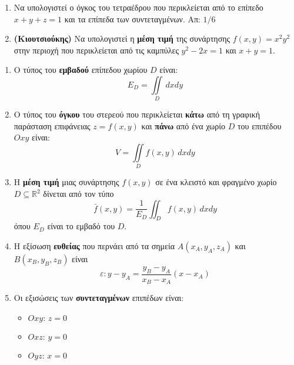 \documentclass[a4paper,table]{report}
\begin{document}
\begin{enumerate}

  \item Να υπολογιστεί ο όγκος του τετραέδρου που περικλείεται από το 
    επίπεδο $x+y+z=1$ και τα επίπεδα των συντεταγμένων.  
    \hfill Απ: ${1}/{6}$ %

  \item 
    \textbf{(Κιουτσιούκης)} Να υπολογιστεί η \textbf{μέση τιμή} της συνάρτησης 
    $ f(x,y) = x^{2}y^{2} $ στην περιοχή που περικλείεται από τις καμπύλες 
    $ y^{2}-2x=1 $ και $ x+y=1 $. 
\end{enumerate}

\vspace{\baselineskip}

\begin{center}
  \minibox{\large\bf \textcolor{Col1}{Υποδείξεις}}
\end{center}

\vspace{\baselineskip}

\begin{enumerate}
  \item Ο τύπος του \textbf{εμβαδού} επίπεδου χωρίου $D$ είναι: 
    \[
      E_{D}=\iint\limits_{D}\,dxdy
    \]

  \item Ο τύπος του \textbf{όγκου} του στερεού που περικλείεται \textbf{κάτω} 
    από τη γραφική παράσταση επιφάνειας $z=f(x,y)$ και \textbf{πάνω} από ένα 
    χωρίο $D$ του επιπέδου $Oxy$ είναι: 
    \[
      V=\iint\limits_{D}f(x,y)\,dxdy
    \]

  \item Η \textbf{μέση τιμή} μιας συνάρτησης $ f(x,y) $ σε ένα κλειστό και 
    φραγμένο χωρίο $D\subseteq \mathbb{R}^{2}$ δίνεται από τον τύπο 
    \[
      \bar{f}(x, y) = \frac{1}{E_{D}} \iint_{D}f(x,y)\,dxdy
    \]
    όπου $ E_{D} $ είναι το εμβαδό του $D$.

  \item Η εξίσωση \textbf{ευθείας} που περνάει από τα σημεία $ A(x_{A},y_{A},z_{A}) $ 
    και $ B(x_{B},y_{B},z_{B}) $ είναι 
    \[
      \varepsilon : y - y_{A} = \frac{y_{B}-y_{A}}{x_{B}-x_{A}} (x-x_{A})
    \]

  \item Οι εξισώσεις των \textbf{συντεταγμένων} επιπέδων είναι:
    \begin{itemize}
      \item $Oxy: \, z=0$
      \item $Oxz: \, y=0$
      \item $Oyz: \, x=0$
    \end{itemize}

\end{enumerate}
\end{document}
